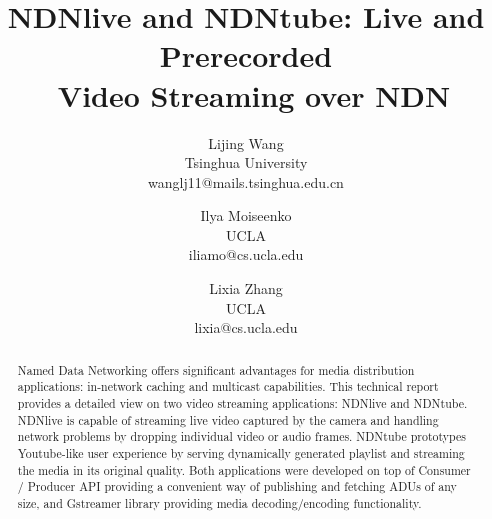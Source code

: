\documentclass{sig-alternate}
\title{NDNlive and NDNtube: Live and Prerecorded \\\ Video Streaming over NDN}
\author{
Lijing Wang \\ {\normalsize Tsinghua University} \\ {\normalsize wanglj11@mails.tsinghua.edu.cn }
\and Ilya Moiseenko \\ {\normalsize UCLA} \\ {\normalsize iliamo@cs.ucla.edu }
\and Lixia Zhang \\ {\normalsize UCLA} \\ {\normalsize lixia@cs.ucla.edu }
}
\begin{document}
\maketitle

\begin{abstract}
Named Data Networking offers significant advantages for media distribution applications: in-network caching and multicast capabilities. This technical report provides a detailed view on two video streaming applications: NDNlive and NDNtube. NDNlive is capable of streaming live video captured by the camera and handling network problems by dropping individual video or audio frames. NDNtube prototypes Youtube-like user experience by serving dynamically generated playlist and streaming the media in its original quality. Both applications were developed on top of Consumer / Producer API providing a convenient way of publishing and fetching ADUs of any size, and Gstreamer library providing media decoding/encoding functionality.
\end{abstract}








%


%



\end{document}
